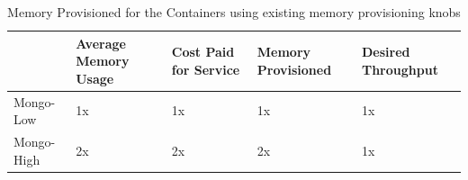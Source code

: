 	\vspace*{1em}	
	\begin{table}[!h]
	  \begin{center}
	    \begin{tabular}{ l | p{3cm} | p{2.2cm} | p{2.2cm} | p{2.2cm} }	      	    
		  & Average Memory Usage & Cost Paid for Service & Memory Provisioned & Desired Throughput \\ 
	      \hline
	      \hline
	      Mongo-Low  & 1x & 1x & 1x & 1x \\  
	      \hline
	      Mongo-High & 2x & 2x & 2x & 1x \\
		
	    \end{tabular}
	  \caption{Memory Provisioned for the Containers using existing memory provisioning knobs}
	  \label{table_initial}
	  \end{center}	  
	\end{table}
	\vspace*{1em}
	
	\pagebreak
	
